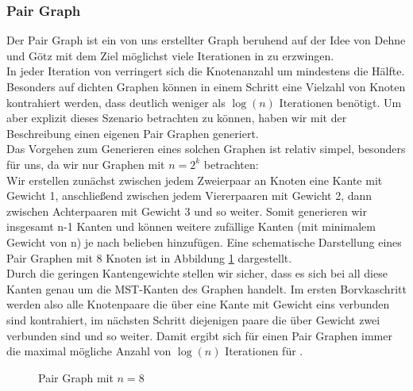 \subsubsection{Pair Graph}
Der Pair Graph ist ein von uns erstellter Graph beruhend auf der Idee von Dehne und Götz \cite{dehne1998practical} mit dem Ziel möglichst viele Iterationen in \boruvkasAlgorithmus zu erzwingen.\\
In jeder Iteration von \boruvkasAlgorithmus verringert sich die Knotenanzahl um mindestens die Hälfte. Besonders auf dichten Graphen können in einem Schritt eine Vielzahl von Knoten kontrahiert werden, dass \boruvkasAlgorithmus deutlich weniger als $\log(n)$ Iterationen benötigt. Um aber explizit dieses Szenario betrachten zu können, haben wir mit der Beschreibung  einen eigenen Pair Graphen generiert. \\

Das Vorgehen zum Generieren eines solchen Graphen ist relativ simpel, besonders für uns, da wir nur Graphen mit $n = 2^k$ betrachten: \\
Wir erstellen zunächst zwischen jedem Zweierpaar an Knoten eine Kante mit Gewicht 1, anschließend zwischen jedem Viererpaaren mit Gewicht 2, dann zwischen Achterpaaren mit Gewicht 3 und so weiter. Somit generieren wir insgesamt n-1 Kanten und können weitere zufällige Kanten (mit minimalem Gewicht von n) je nach belieben hinzufügen. 
Eine schematische Darstellung eines Pair Graphen mit 8 Knoten ist in Abbildung \cref{Pair-Graph-Img} dargestellt.\\

Durch die geringen Kantengewichte stellen wir sicher, dass es sich bei all diese Kanten genau um die MST-Kanten des Graphen handelt. Im ersten Borvkaschritt werden also alle Knotenpaare die über eine Kante mit Gewicht eins verbunden sind kontrahiert, im nächsten Schritt diejenigen paare die über Gewicht zwei verbunden sind und so weiter. Damit ergibt sich für einen Pair Graphen immer die maximal mögliche Anzahl von $\log(n)$ Iterationen für \boruvkasAlgorithmus.

\begin{figure}[H]
    \centering
    
    \caption{Pair Graph mit $n=8$}
    \label{Pair-Graph-Img}
\end{figure}


